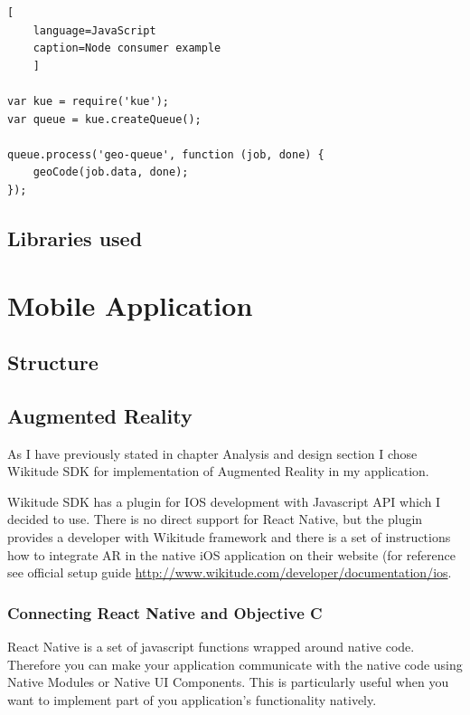 \documentclass[thesis=M,english]{FITthesis}[2012/10/20]
\begin{document}
\begin{listing}
\begin{lstlisting}[
	language=JavaScript
	caption=Node consumer example
	]

var kue = require('kue');
var queue = kue.createQueue();

queue.process('geo-queue', function (job, done) {
    geoCode(job.data, done);
});

\end{lstlisting}
\caption{Node consumer} 
\label{lst:consumer}
\end{listing}



\subsection{Libraries used}

\section{Mobile Application}

\subsection{Structure}
\subsection{Augmented Reality}
As I have previously stated in chapter Analysis and design section  I chose Wikitude SDK for implementation of Augmented Reality in my application. 

Wikitude SDK has a plugin for IOS development with Javascript API which I decided to use. There is no direct support for React Native, but the plugin provides a developer with Wikitude framework and there is a set of instructions how to integrate AR in the native iOS application on their website (for reference see official setup guide \url{http://www.wikitude.com/developer/documentation/ios}. 

\subsubsection{Connecting React Native and Objective C}
React Native is a set of javascript functions wrapped around native code. Therefore you can make your application communicate with the native code using Native Modules or Native UI Components. This is particularly useful when you want to implement part of you application's functionality natively.  
\end{document}
